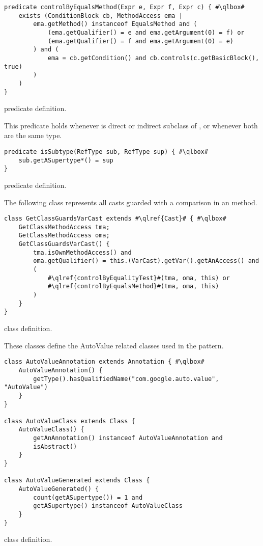 \begin{listing}
\begin{verbatim}
predicate controlByEqualsMethod(Expr e, Expr f, Expr c) { #\qlbox#
	exists (ConditionBlock cb, MethodAccess ema |
		ema.getMethod() instanceof EqualsMethod and (
			(ema.getQualifier() = e and ema.getArgument(0) = f) or
			(ema.getQualifier() = f and ema.getArgument(0) = e)
		) and (
			ema = cb.getCondition() and cb.controls(c.getBasicBlock(), true)
		)
	)
}
\end{verbatim}
\caption{ predicate definition.}
\label{lst:ql:controlByEqualsMethod}
\end{listing}

This predicate holds whenever  is direct or indirect subclass of , or whenever both are the same type.

\begin{listing}
\begin{verbatim}
predicate isSubtype(RefType sub, RefType sup) { #\qlbox#
	sub.getASupertype*() = sup
}
\end{verbatim}
\caption{ predicate definition.}
\label{lst:ql:isSubtype}
\end{listing}

The following class represents all casts guarded with a  comparison in an  method.

\begin{listing}
\begin{verbatim}	
class GetClassGuardsVarCast extends #\qlref{Cast}# { #\qlbox#
	GetClassMethodAccess tma;
	GetClassMethodAccess oma;
	GetClassGuardsVarCast() {
		tma.isOwnMethodAccess() and
		oma.getQualifier() = this.(VarCast).getVar().getAnAccess() and
		(
			#\qlref{controlByEqualityTest}#(tma, oma, this) or
			#\qlref{controlByEqualsMethod}#(tma, oma, this)
		)
	}
}
\end{verbatim}
\caption{ class definition.}
\label{lst:ql:GetClassGuardsVarCast}
\end{listing}

These classes define the AutoValue related classes used in the  pattern.

\begin{listing}
\begin{verbatim}	
class AutoValueAnnotation extends Annotation { #\qlbox#
	AutoValueAnnotation() {
		getType().hasQualifiedName("com.google.auto.value", "AutoValue")
	}
}

class AutoValueClass extends Class {
	AutoValueClass() {
		getAnAnnotation() instanceof AutoValueAnnotation and
		isAbstract()
	}
}

class AutoValueGenerated extends Class {
	AutoValueGenerated() {
		count(getASupertype()) = 1 and
		getASupertype() instanceof AutoValueClass
	}
}
\end{verbatim}
\caption{ class definition.}
\label{lst:ql:AutoValueGenerated}
\end{listing}

